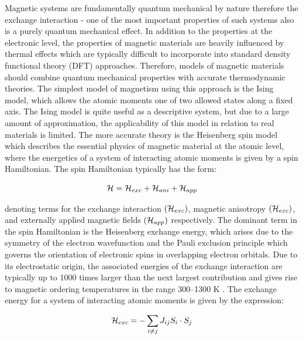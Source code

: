 Magnetic systems are fundamentally quantum mechanical by nature therefore the exchange interaction - one of the most important properties of such systems also is a purely quantum mechanical effect. In addition to the properties at the electronic level, the properties of magnetic materials are heavily influenced by thermal effects which are typically difficult to incorporate into standard density functional theory (DFT) approaches. Therefore, models of magnetic materials should combine quantum mechanical properties with accurate thermodynamic theories. The simplest model of magnetism using this approach is the Ising model, which allows the atomic moments one of two allowed states along a fixed axis. The Ising model is quite useful as a descriptive system, but due to a large amount of approximation, the applicability of this model in relation to real materials is limited.
The more accurate theory is the Heisenberg spin model which describes the essential physics of magnetic material at the atomic level, where the energetics of a system of interacting atomic moments is given by a spin Hamiltonian. The spin Hamiltonian  typically has the form:

\begin{equation}
{\cal H}={\cal H}_{exc}+{\cal H}_{ani}+{\cal H}_{app}
\end{equation}

denoting terms for the exchange interaction $({\cal H}_{exc})$, magnetic anisotropy $({\cal H}_{exc})$, and externally applied magnetic fields $({\cal H}_{app})$ respectively. The dominant term in the spin Hamiltonian is the Heisenberg exchange energy, which arises due to the symmetry of the electron wavefunction and the Pauli exclusion principle which governs the orientation of electronic spins in overlapping electron orbitals. Due to its electrostatic origin, the associated energies of the exchange interaction are typically up to 1000 times larger than the next largest contribution and gives rise to magnetic ordering temperatures in the range 300–1300 K \cite{Shahjahan_2016}. The exchange energy for a system of interacting atomic moments is given by the expression:

\begin{equation}
{\cal H}_{exc}=-\sum_{i\neq j} J_{ij}S_i \cdot S_j
\end{equation}

